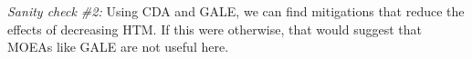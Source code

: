 \documentclass[journal]{IEEEtran}
\begin{document}
{\em Sanity check \#2:} Using CDA and GALE, we can find mitigations that reduce the effects of decreasing HTM. 
If this were otherwise, that would suggest that MOEAs like GALE are not useful here.






\end{document}
